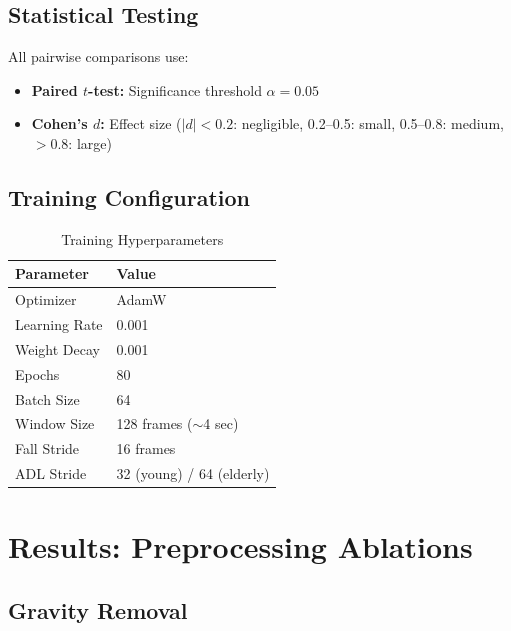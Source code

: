 \documentclass[journal,12pt]{IEEEtran}
\begin{document}
\subsection{Statistical Testing}

All pairwise comparisons use:
\begin{itemize}
    \item \textbf{Paired $t$-test:} Significance threshold $\alpha = 0.05$
    \item \textbf{Cohen's $d$:} Effect size ($|d| < 0.2$: negligible, 0.2--0.5: small, 0.5--0.8: medium, $>0.8$: large)
\end{itemize}

\subsection{Training Configuration}

\begin{table}[htbp]
\centering
\caption{Training Hyperparameters}
\label{tab:training}
\begin{tabular}{@{}ll@{}}
\toprule
\textbf{Parameter} & \textbf{Value} \\
\midrule
Optimizer & AdamW \\
Learning Rate & 0.001 \\
Weight Decay & 0.001 \\
Epochs & 80 \\
Batch Size & 64 \\
Window Size & 128 frames ($\sim$4 sec) \\
Fall Stride & 16 frames \\
ADL Stride & 32 (young) / 64 (elderly) \\
\bottomrule
\end{tabular}
\end{table}


\section{Results: Preprocessing Ablations}
\label{sec:preprocess}

\subsection{Gravity Removal}
\end{document}
